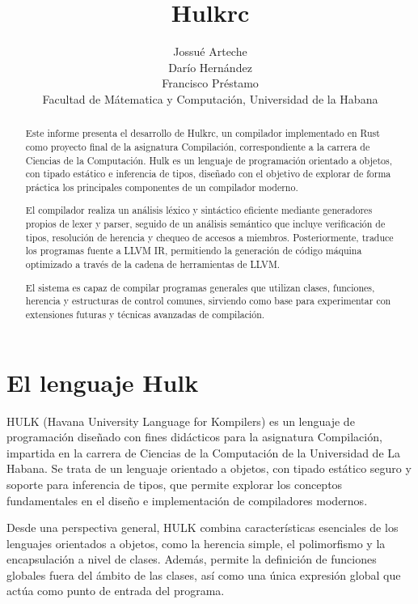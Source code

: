 \documentclass{article}
\begin{document}
\title{Hulkrc}
\author{Jossué Arteche \\
Darío Hernández \\
Francisco Préstamo \\
Facultad de Mátematica y Computación, Universidad de la Habana
}

\maketitle
\tableofcontents

\begin{abstract}
Este informe presenta el desarrollo de Hulkrc, un compilador implementado en Rust como proyecto final de la asignatura Compilación, correspondiente a la carrera de Ciencias de la Computación. Hulk es un lenguaje de programación orientado a objetos, con tipado estático e inferencia de tipos, diseñado con el objetivo de explorar de forma práctica los principales componentes de un compilador moderno.

El compilador realiza un análisis léxico y sintáctico eficiente mediante generadores propios de lexer y parser, seguido de un análisis semántico que incluye verificación de tipos, resolución de herencia y chequeo de accesos a miembros. Posteriormente, traduce los programas fuente a LLVM IR, permitiendo la generación de código máquina optimizado a través de la cadena de herramientas de LLVM.

El sistema es capaz de compilar programas generales que utilizan clases, funciones, herencia y estructuras de control comunes, sirviendo como base para experimentar con extensiones futuras y técnicas avanzadas de compilación.

\end{abstract}
%
%
%
\section{El lenguaje Hulk}
HULK (Havana University Language for Kompilers) es un lenguaje de programación diseñado con fines didácticos para la asignatura Compilación, impartida en la carrera de Ciencias de la Computación de la Universidad de La Habana. Se trata de un lenguaje orientado a objetos, con tipado estático seguro y soporte para inferencia de tipos, que permite explorar los conceptos fundamentales en el diseño e implementación de compiladores modernos.

Desde una perspectiva general, HULK combina características esenciales de los lenguajes orientados a objetos, como la herencia simple, el polimorfismo y la encapsulación a nivel de clases. Además, permite la definición de funciones globales fuera del ámbito de las clases, así como una única expresión global que actúa como punto de entrada del programa.
\end{document}
